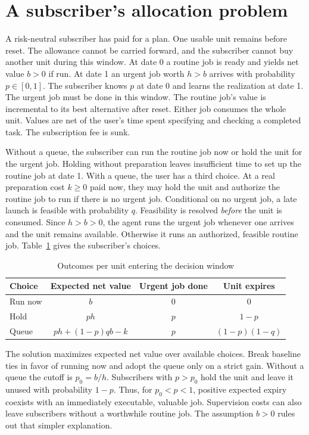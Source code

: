 \documentclass[11pt]{article}
\begin{document}
\section{A subscriber's allocation problem}

A risk-neutral subscriber has paid for a plan. One usable unit remains before reset. The allowance cannot be carried forward, and the subscriber cannot buy another unit during this window. At date 0 a routine job is ready and yields net value $b>0$ if run. At date 1 an urgent job worth $h>b$ arrives with probability $p\in[0,1]$. The subscriber knows $p$ at date 0 and learns the realization at date 1. The urgent job must be done in this window. The routine job's value is incremental to its best alternative after reset. Either job consumes the whole unit. Values are net of the user's time spent specifying and checking a completed task. The subscription fee is sunk.

Without a queue, the subscriber can run the routine job now or hold the unit for the urgent job. Holding without preparation leaves insufficient time to set up the routine job at date 1. With a queue, the user has a third choice. At a real preparation cost $k\geq0$ paid now, they may hold the unit and authorize the routine job to run if there is no urgent job. Conditional on no urgent job, a late launch is feasible with probability $q$. Feasibility is resolved \emph{before} the unit is consumed. Since $h>b>0$, the agent runs the urgent job whenever one arrives and the unit remains available. Otherwise it runs an authorized, feasible routine job. Table~\ref{tab:policies} gives the subscriber's choices.

\begin{table}[ht]
\centering
\caption{Outcomes per unit entering the decision window}\label{tab:policies}
\begin{tabular}{@{}lccc@{}}\toprule
Choice & Expected net value & Urgent job done & Unit expires \\ \midrule
Run now & $b$ & $0$ & $0$ \\
Hold & $ph$ & $p$ & $1-p$ \\
Queue & $ph+(1-p)qb-k$ & $p$ & $(1-p)(1-q)$ \\ \bottomrule
\end{tabular}
\end{table}

The solution maximizes expected net value over available choices. Break baseline ties in favor of running now and adopt the queue only on a strict gain. Without a queue the cutoff is $p_0=b/h$. Subscribers with $p>p_0$ hold the unit and leave it unused with probability $1-p$. Thus, for $p_0<p<1$, positive expected expiry coexists with an immediately executable, valuable job. Supervision costs can also leave subscribers without a worthwhile routine job. The assumption $b>0$ rules out that simpler explanation.
\end{document}
